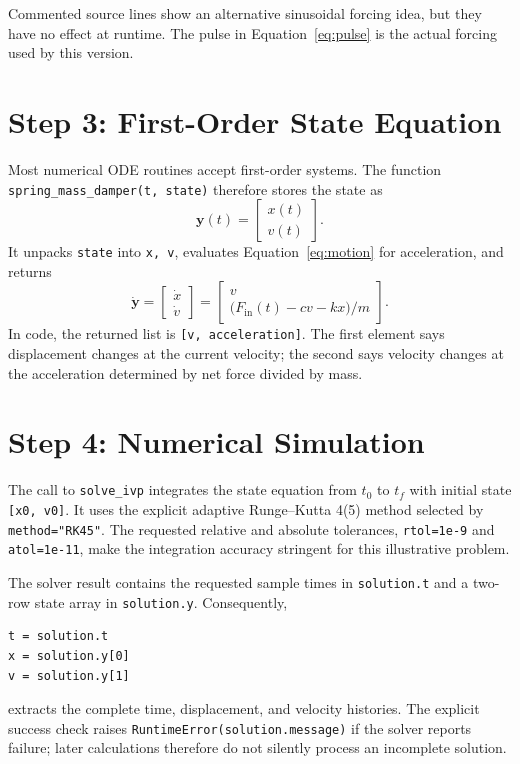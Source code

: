 \documentclass[11pt]{article}
\begin{document}
Commented source lines show an alternative sinusoidal forcing idea, but they have no effect at runtime. The pulse in Equation~\ref{eq:pulse} is the actual forcing used by this version.

\section{Step 3: First-Order State Equation}
Most numerical ODE routines accept first-order systems. The function \texttt{spring\_mass\_damper(t, state)} therefore stores the state as
\begin{equation}
\mathbf{y}(t)=\begin{bmatrix}x(t)\\v(t)\end{bmatrix}.
\end{equation}
It unpacks \texttt{state} into \texttt{x, v}, evaluates Equation~\ref{eq:motion} for acceleration, and returns
\begin{equation}
\dot{\mathbf{y}}=
\begin{bmatrix}
\dot{x}\\\dot{v}
\end{bmatrix}
=
\begin{bmatrix}
v\\[3pt]
\bigl(F_{\mathrm{in}}(t)-cv-kx\bigr)/m
\end{bmatrix}.
\end{equation}
In code, the returned list is \texttt{[v, acceleration]}. The first element says displacement changes at the current velocity; the second says velocity changes at the acceleration determined by net force divided by mass.

\section{Step 4: Numerical Simulation}
The call to \texttt{solve\_ivp} integrates the state equation from $t_0$ to $t_f$ with initial state \texttt{[x0, v0]}. It uses the explicit adaptive Runge--Kutta 4(5) method selected by \texttt{method="RK45"}. The requested relative and absolute tolerances, \texttt{rtol=1e-9} and \texttt{atol=1e-11}, make the integration accuracy stringent for this illustrative problem.

The solver result contains the requested sample times in \texttt{solution.t} and a two-row state array in \texttt{solution.y}. Consequently,
\begin{lstlisting}
t = solution.t
x = solution.y[0]
v = solution.y[1]
\end{lstlisting}
extracts the complete time, displacement, and velocity histories. The explicit success check raises \texttt{RuntimeError(solution.message)} if the solver reports failure; later calculations therefore do not silently process an incomplete solution.
\end{document}
